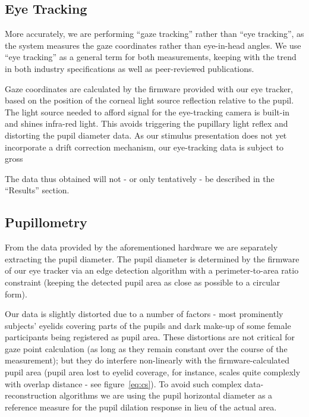 	\subsection{Eye Tracking}\label{sec:m_om_et}
	    More accurately, we are performing “gaze tracking” rather than “eye tracking”, as the system measures the gaze coordinates rather than eye-in-head angles.
	    We use “eye tracking” as a general term for both measurements, keeping with the trend in both industry specifications\cite{Bojko2006} as well as peer-reviewed publications\cite{Kirk2013}.
	    
	    Gaze coordinates are calculated by the firmware provided with our eye tracker, based on the position of the corneal light source reflection relative to the pupil.
	    The light source needed to afford signal for the eye-tracking camera is built-in and shines infra-red light.
	    This avoids triggering the pupillary light reflex \cite{Ellis1981} and distorting the pupil diameter data.
	    As our stimulus presentation does not yet incorporate a drift correction mechanism, our eye-tracking data is subject to gross   
	    
	    The data thus obtained will not - or only tentatively - be described in the “Results” section.
	\subsection{Pupillometry}\label{sec:m_om_pm}
	    From the data provided by the aforementioned hardware we are separately extracting the pupil diameter.
	    The pupil diameter is determined by the firmware of our eye tracker via an edge detection algorithm with a perimeter-to-area ratio constraint
	    (keeping the detected pupil area as close as possible to a circular form).
	    
	    Our data is slightly distorted due to a number of factors - most prominently subjects' eyelids covering parts of the pupils and dark make-up of some female participants being registered as pupil area.
	    These distortions are not critical for gaze point calculation (as long as they remain constant over the course of the measurement); 
	    but they do interfere non-linearly with the firmware-calculated pupil area 
	    (pupil area lost to eyelid coverage, for instance, scales quite complexly with overlap distance - see figure~\ref{eq:cs}).
	    To avoid such complex data-reconstruction algorithms we are using the pupil horizontal diameter as a reference measure for the pupil dilation response in lieu of the actual area.
	    
